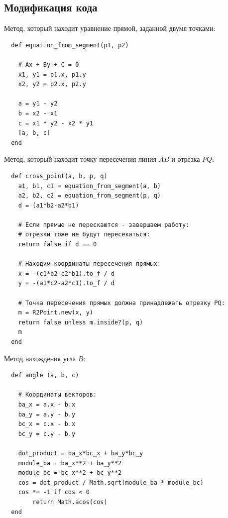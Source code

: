 \subsection{Модификация кода}



Метод, который находит уравнение прямой, заданной двумя точками:

\begin{small}
\begin{verbatim}
  def equation_from_segment(p1, p2)
 
    # Ax + By + C = 0
    x1, y1 = p1.x, p1.y
    x2, y2 = p2.x, p2.y

    a = y1 - y2
    b = x2 - x1
    c = x1 * y2 - x2 * y1
    [a, b, c]
  end
\end{verbatim}
\end{small}


Метод, который находит точку пересечения линия $AB$ и отрезка $PQ$:

\begin{small}
\begin{verbatim}
  def cross_point(a, b, p, q)
    a1, b1, c1 = equation_from_segment(a, b)
    a2, b2, c2 = equation_from_segment(p, q)
    d = (a1*b2-a2*b1)
    
    # Если прямые не перескаются - завершаем работу:
    # отрезки тоже не будут пересекаться:
    return false if d == 0

    # Находим координаты пересечения прямых:
    x = -(c1*b2-c2*b1).to_f / d
    y = -(a1*c2-a2*c1).to_f / d

    # Точка пересечения прямых должна принадлежать отрезку PQ:
    m = R2Point.new(x, y)
    return false unless m.inside?(p, q)
    m
  end 
\end{verbatim}
\end{small}

Метод нахождения угла $B$:

\begin{small}
\begin{verbatim}
  def angle (a, b, c)
    
    # Координаты векторов:
    ba_x = a.x - b.x
    ba_y = a.y - b.y
    bc_x = c.x - b.x
    bc_y = c.y - b.y

    dot_product = ba_x*bc_x + ba_y*bc_y 
    module_ba = ba_x**2 + ba_y**2
    module_bc = bc_x**2 + bc_y**2
    cos = dot_product / Math.sqrt(module_ba * module_bc)
    cos *= -1 if cos < 0
	    return Math.acos(cos)
  end
\end{verbatim}
\end{small}


